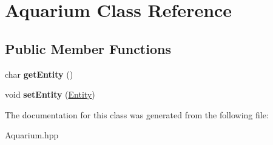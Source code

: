 \hypertarget{class_aquarium}{}\section{Aquarium Class Reference}
\label{class_aquarium}
\subsection*{Public Member Functions}
\begin{DoxyCompactItemize}
\item 
\mbox{\label{class_aquarium_acbf7e576e86b0bb641ff93d479936a04}} 
char {\bfseries get\+Entity} ()
\item 
\mbox{\label{class_aquarium_ae48965035f8aa2ad3cbb54f6cbf9f34e}} 
void {\bfseries set\+Entity} (\mbox{\hyperlink{class_entity}{Entity}})
\end{DoxyCompactItemize}


The documentation for this class was generated from the following file\+:\begin{DoxyCompactItemize}
\item 
Aquarium.\+hpp\end{DoxyCompactItemize}
